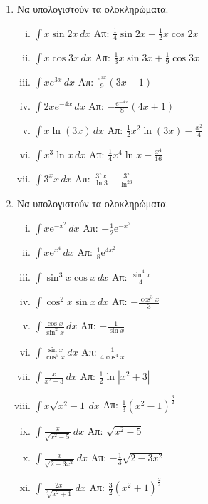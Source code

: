 \documentclass[a4paper,table]{report}
\begin{document}
\begin{center}
  \minibox{{\large\bfseries \textcolor{Col1}{Ασκήσεις στα Αόριστα Ολοκληρώματα}}}
\end{center}

\vspace{\baselineskip}


\begin{enumerate}

  \item Να υπολογιστούν τα ολοκληρώματα.
    \begin{enumerate}[i)]
      \item $\int x\sin2x \, dx$ \hfill Απ: $\frac{1}{4}\sin2x-\frac{1}{2}x\cos2x$
      \item $\int x\cos3x \, dx$ \hfill Απ: $\frac{1}{3}x\sin3x+ \frac{1}{9}\cos3x$
      \item $\int xe^{3x} \, dx$ \hfill Απ: $\frac{e^{3x}}{9}(3x-1)$
      \item $\int 2xe^{-4x} \, dx$ \hfill Απ: $-\frac{e^{-4x}}{8}(4x+1)$
      \item $ \int x \ln{(3x)} \,{dx} $ \hfill Απ: $ \frac{1}{2} x^{2} \ln{(3x)} -
        \frac{x^{2}}{4} $ 
      \item $ \int x^{3} \ln{x} \,{dx} $ \hfill Απ: $ \frac{1}{4} x^{4} \ln{x} -
        \frac{x^{4}}{16} $
      \item $\int 3^{x}x \, dx$ \hfill Απ: $\frac{3^xx}{\ln3}-\frac{3^x}{\ln^23}$
    \end{enumerate}

  \item Να υπολογιστούν τα ολοκληρώματα.
    \begin{enumerate}[i)]
      \item $ \int x \mathrm{e}^{-x^2} \,{dx} $ \hfill Απ: $ - \frac{1}{2}
        \mathrm{e}^{-x^{2}} $ 
      \item $ \int x \mathrm{e}^{x^4} \,{dx} $ \hfill Απ: $ \frac{1}{8}
        \mathrm{e}^{4x^{2}} $ 
      \item $\int \sin^3x\cos x \, dx$ \hfill Απ: $\frac{\sin^{4}x}{4}$
      \item $\int \cos^2x\sin x \, dx$ \hfill Απ: $-\frac{\cos^{3}x}{3}$
      \item $ \int \frac{\cos{x}}{\sin^{2}{x}}  \,{dx} $ \hfill Απ: $ -
        \frac{1}{\sin{x}} $ 
      \item $ \int \frac{\sin{x}}{\cos^{5}{x}}  \,{dx} $ \hfill Απ: $ 
        \frac{1}{4\cos^{4}{x}} $ 
      \item $\int\frac{x}{x^2+3} \, dx$ \hfill Απ: $\frac{1}{2}\ln|x^2+3|$
      \item $ \int x \sqrt{x^{2}-1} \,{dx} $ 
        \hfill Απ: $ \frac{1}{3} (x^{2}-1)^{\frac{3}{2}} $  
      \item $\int\frac{x}{\sqrt{x^{2}-5}} \, dx$ \hfill Απ: $ \sqrt{x^{2}-5} $
      \item $\int\frac{x}{\sqrt{2-3x^{2}}} \, dx$ \hfill Απ: $ - \frac{1}{3}
      \sqrt{2-3x^{2}} $
      \item $ \int \frac{2x}{\sqrt[3]{x^{2}+1}} \,{dx} $ 
        \hfill Απ: $ \frac{3}{2} (x^{2}+1)^{\frac{2}{3}} $ 
    \end{enumerate}

\end{enumerate}
\end{document}
